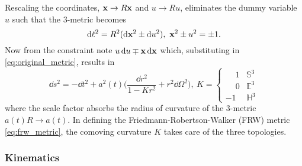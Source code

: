 Rescaling the coordinates, \(\vb{x} \rightarrow R\vb{x}\) and \(u \rightarrow Ru\), eliminates the dummy variable \(u\) such that the 3-metric becomes
%
\begin{equation}
	\dd{\ell^{2}}
    = R^{2} (\dd{\vb{x}^{2}} \pm \dd{u^{2}}),\
    \vb{x}^{2} \pm u^{2}
    = \pm 1.
\end{equation}
%
Now from the constraint note \(u\dd{u} \mp \vb{x}\dd{\vb{x}}\) which, substituting in \cref{eq:original_metric}, results in
%
\begin{equation}\label{eq:frw_metric}
	\dd{s^{2}}
    = -\dd{t^{2}} + a^{2}(t) \bigg( \frac{\dd{r^{2}}}{1-Kr^{2}} + r^{2}\dd{\Omega^{2}} \bigg),\
    K =
	\begin{cases}
		\mathbin{\phantom{-}}1 & \mathbb{S}^{3} \\
		\mathbin{\phantom{-}}0 & \mathbb{E}^{3} \\
		-1                     & \mathbb{H}^{3}
	\end{cases}
\end{equation}
%
where the scale factor absorbs the radius of curvature of the 3-metric \(a(t)R \rightarrow a(t)\).
In defining the Friedmann-Robertson-Walker (FRW) metric \cref{eq:frw_metric}, the comoving curvature \(K\) takes care of the three topologies.

\subsubsection{Kinematics}

